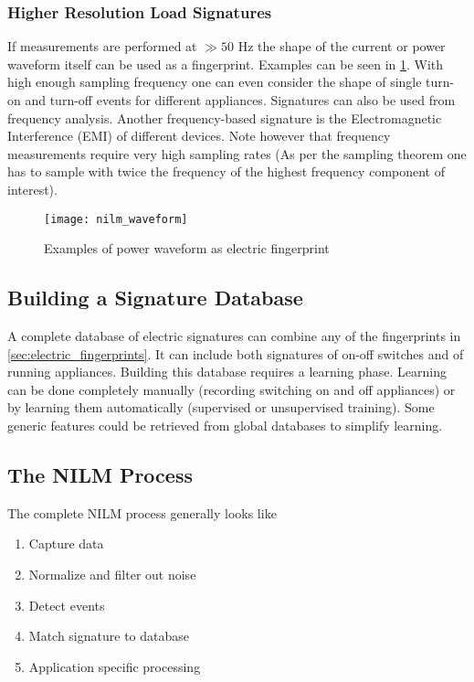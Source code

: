 \subsubsection{Higher Resolution Load Signatures}
If measurements are performed at $\gg 50$ Hz the shape of the current or power waveform itself can be used as a fingerprint.
Examples can be seen in \ref{fig:nilm_waveform}.
With high enough sampling frequency one can even consider the shape of single turn-on and turn-off events for different appliances.
Signatures can also be used from frequency analysis.
Another frequency-based signature is the Electromagnetic Interference (EMI) of different devices.
Note however that frequency measurements require very high sampling rates (As per the sampling theorem one has to sample with twice the frequency of the highest frequency component of interest).

\begin{figure}
    \centering
    \texttt{[image: nilm\_waveform]}
    \caption{Examples of power waveform as electric fingerprint}
    \label{fig:nilm_waveform}
\end{figure}

\subsection{Building a Signature Database}
A complete database of electric signatures can combine any of the fingerprints in \ref{sec:electric_fingerprints}.
It can include both signatures of on-off switches and of running appliances.
Building this database requires a learning phase.
Learning can be done completely manually (recording switching on and off appliances) or by learning them automatically (supervised or unsupervised training).
Some generic features could be retrieved from global databases to simplify learning.\\

\subsection{The NILM Process}
The complete NILM process generally looks like

\begin{enumerate}
    \item Capture data
    \item Normalize and filter out noise
    \item Detect events
    \item Match signature to database
    \item Application specific processing
\end{enumerate}

